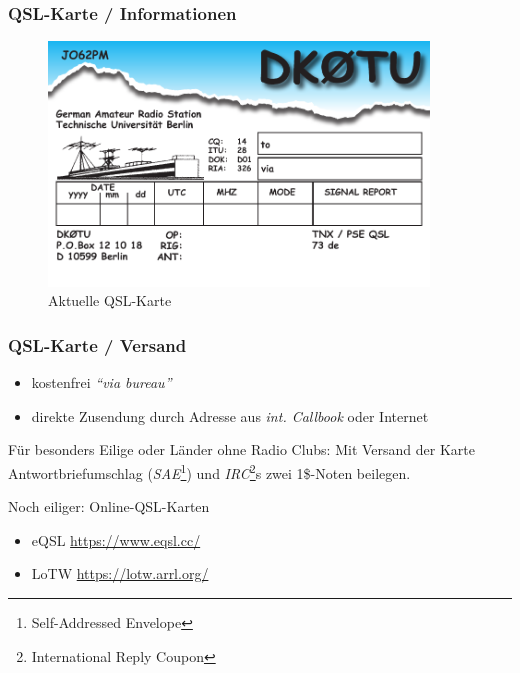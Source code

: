 \begin{frame}
  \frametitle{QSL-Karte / Informationen}

  \begin{center}
    \begin{figure}
      \includegraphics[width=0.9\textwidth,height=.75\textheight,keepaspectratio]{bv13/dk0tu_qsl2.pdf}
      \caption{Aktuelle QSL-Karte}
    \end{figure}
  \end{center}

\end{frame}

\begin{frame}
  \frametitle{QSL-Karte / Versand}

  \begin{itemize}
    \item kostenfrei \emph{``via bureau''}
    \item direkte Zusendung durch Adresse aus \emph{int. Callbook} oder Internet
  \end{itemize}

  Für besonders Eilige oder Länder ohne Radio Clubs: Mit Versand der Karte
  Antwortbriefumschlag (\emph{SAE}\footnote{Self-Addressed Envelope}) und
  \emph{IRC}\footnote{International Reply Coupon}s zwei 1\$-Noten beilegen. \\[2em]

  \pause

  Noch eiliger: Online-QSL-Karten
  \begin{itemize}
    \item eQSL \ExternalLink\url{https://www.eqsl.cc/}
    \item LoTW \ExternalLink\url{https://lotw.arrl.org/}
  \end{itemize}

\end{frame}

